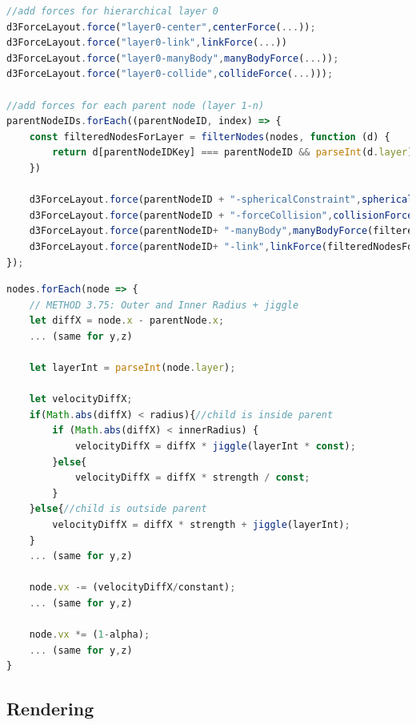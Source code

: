\begin{lstlisting}[language=JavaScript,label={lst:addForces},caption=Simplified algorithm that shows which forces are added to the simulation.] 
//add forces for hierarchical layer 0
d3ForceLayout.force("layer0-center",centerForce(...));
d3ForceLayout.force("layer0-link",linkForce(...))
d3ForceLayout.force("layer0-manyBody",manyBodyForce(...));
d3ForceLayout.force("layer0-collide",collideForce(...)));

//add forces for each parent node (layer 1-n)
parentNodeIDs.forEach((parentNodeID, index) => {
    const filteredNodesForLayer = filterNodes(nodes, function (d) {
        return d[parentNodeIDKey] === parentNodeID && parseInt(d.layer) === childLayer;
    })

    d3ForceLayout.force(parentNodeID + "-sphericalConstraint",sphericalConstraint(filteredNodesForLayer,...));
    d3ForceLayout.force(parentNodeID + "-forceCollision",collisionForce(filteredNodesForLayer,...));
    d3ForceLayout.force(parentNodeID+ "-manyBody",manyBodyForce(filteredNodesForLayer,...));
    d3ForceLayout.force(parentNodeID+ "-link",linkForce(filteredNodesForLayer,...));
});
\end{lstlisting}
\begin{lstlisting}[language=JavaScript,label={lst:sphericalConstraint},caption=Simplified algorithm for the spherical constraint. We apply adapted velocities whenever the child node is inside the parent. In addition we further determine if the childnode is already inside an closer radius or not.] 
nodes.forEach(node => {
    // METHOD 3.75: Outer and Inner Radius + jiggle
    let diffX = node.x - parentNode.x;
    ... (same for y,z)

    let layerInt = parseInt(node.layer);

    let velocityDiffX;
    if(Math.abs(diffX) < radius){//child is inside parent
        if (Math.abs(diffX) < innerRadius) {
            velocityDiffX = diffX * jiggle(layerInt * const);
        }else{
            velocityDiffX = diffX * strength / const;
        } 
    }else{//child is outside parent
        velocityDiffX = diffX * strength + jiggle(layerInt);
    }
    ... (same for y,z)

    node.vx -= (velocityDiffX/constant);
    ... (same for y,z)

    node.vx *= (1-alpha);
    ... (same for y,z)
}
\end{lstlisting}

\subsection{Rendering}
\label{sec:rendering}

